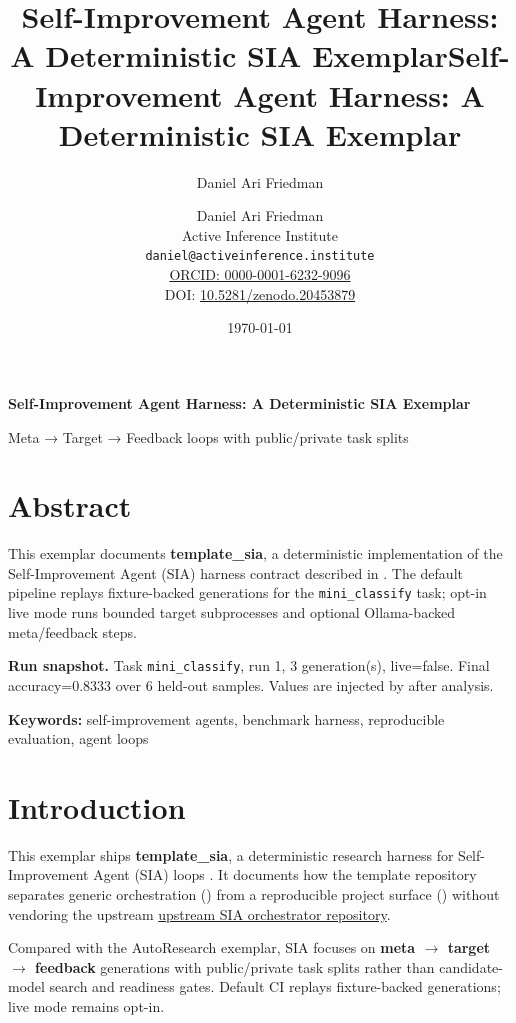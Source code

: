 \documentclass[
  english,
]{article}
\title{Self-Improvement Agent Harness: A Deterministic SIA Exemplar}
\author{Daniel Ari Friedman}
\date{}
\title{Self-Improvement Agent Harness: A Deterministic SIA Exemplar}
\author{Daniel Ari Friedman\\\footnotesize{Active Inference Institute}\\\footnotesize{\texttt{daniel@activeinference.institute}}\\\footnotesize{\href{https://orcid.org/0000-0001-6232-9096}{ORCID: 0000-0001-6232-9096}} \\ \footnotesize{DOI: \href{https://doi.org/10.5281/zenodo.20453879}{10.5281/zenodo.20453879}}}
\date{\today}
\begin{document}
\begin{titlepage}
\centering
\vspace*{2cm}
{\LARGE\bfseries Self-Improvement Agent Harness: A Deterministic SIA Exemplar\par}
\vspace{0.75em}
{\large Meta → Target → Feedback loops with public/private task splits\par}
\vfill
\makeatletter
{\@author\par}
\vspace{1em}
{\@date\par}
\makeatother
\vfill
\end{titlepage}
\thispagestyle{empty}
\tableofcontents
\newpage

\section{Abstract}\label{sec:abstract}

This exemplar documents \textbf{template\_sia}, a deterministic
implementation of the Self-Improvement Agent (SIA) harness contract
described in \citep{sia2026}. The default pipeline replays
fixture-backed generations for the \texttt{mini\_classify} task; opt-in
live mode runs bounded target subprocesses and optional Ollama-backed
meta/feedback steps.

\textbf{Run snapshot.} Task \texttt{mini\_classify}, run 1, 3
generation(s), live=false. Final accuracy=0.8333 over 6 held-out
samples. Values are injected by
 after analysis.

\textbf{Keywords:} self-improvement agents, benchmark harness,
reproducible evaluation, agent loops

\newpage

\section{Introduction}\label{sec:introduction}

This exemplar ships \textbf{template\_sia}, a deterministic research
harness for Self-Improvement Agent (SIA) loops \citep{sia2026}. It
documents how the template repository separates generic orchestration
() from a reproducible project surface
() without vendoring the
upstream \href{https://github.com/hexo-ai/sia}{upstream SIA orchestrator
repository}.

Compared with the AutoResearch exemplar, SIA focuses on \textbf{meta \texorpdfstring{\ensuremath{\to}}{->}
target \texorpdfstring{\ensuremath{\to}}{->} feedback} generations with public/private task splits rather
than candidate-model search and readiness gates. Default CI replays
fixture-backed generations; live mode remains opt-in.
\end{document}
